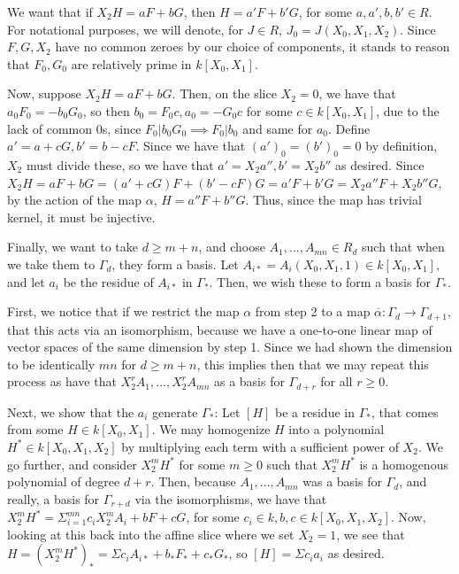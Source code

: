 \documentclass[10pt]{article}
\begin{document}
We want that if $X_2 H = aF + bG$, then $H = a'F + b'G$, for some $a,a',b,b' \in R$. For notational purposes, we will denote, for $J \in R$, $J_0 = J(X_0, X_1, X_2)$. Since $F,G, X_2$ have no common zeroes by our choice of components, it stands to reason that $F_0, G_0$ are relatively prime in $k[X_0,X_1]$.

Now, suppose $X_2 H = aF + bG$. Then, on the slice $X_2 = 0$, we have that $a_0F_0 = - b_0 G_0$, so then $b_0 = F_0c, a_0 = -G_0c$ for some $c \in k[X_0,X_1]$, due to the lack of common 0s, since $F_0 | b_0 G_0 \implies F_0 | b_0$ and same for $a_0$. Define $a' = a  +cG, b' = b - cF$. Since we have that $(a')_0 = (b')_0 = 0$ by definition, $X_2$ must divide these, so we have that $a' = X_2 a'', b' = X_2 b''$ as desired. Since $X_2 H = aF + bG = (a'+cG)F + (b'-cF)G = a'F + b'G = X_2 a''F + X_2 b''G$, by the action of the map $\alpha$, $H = a''F + b''G$. Thus, since the map has trivial kernel, it must be injective.

Finally, we want to take $d \geq m + n$, and choose $A_1,...,A_{mn} \in R_d$ such that when we take them to $\Gamma_d$, they form a basis. Let $A_{i*} = A_i(X_0,X_1,1) \in k[X_0,X_1]$, and let $a_i$ be the residue of $A_{i*}$ in $\Gamma_*$. Then, we wish these to form a basis for $\Gamma_*$.

First, we notice that if we restrict the map $\alpha$ from step 2 to a map $\overline{\alpha}: \Gamma_d \to \Gamma_{d+1}$, that this acts via an isomorphism, because we have a one-to-one linear map of vector spaces of the same dimension by step 1. Since we had shown the dimension to be identically $mn$ for $d \geq m +n$, this implies then that we may repeat this process as have that $X_2^r A_1,...,X_2^r A_{mn}$ as a basis for  $\Gamma_{d+r}$ for all $r \geq 0$.

Next, we show that the $a_i$ generate $\Gamma_*$: Let $[H]$ be a residue in $\Gamma_*$, that comes from some $H \in k[X_0,X_1]$. We may homogenize $H$ into a polynomial $H^* \in k[X_0,X_1,X_2]$ by multiplying each term with a sufficient power of $X_2$. We go further, and consider $X_2^m H^*$ for some $m \geq 0$ such that $X_2^m H^*$ is a homogenous polynomial of degree $d + r$. Then, because $A_1,... ,A_{mn}$ was a basis for $\Gamma_d$, and really, a basis for $\Gamma_{r + d}$ via the isomorphisms, we have that $X_2^m H^* = \Sigma_{i=1}^{mn} c_i X_2^m A_i + bF + cG$, for some $c_i \in k, b,c \in k[X_0,X_1,X_2]$. Now, looking at this back into the affine slice where we set $X_2 = 1$, we see that $H = (X_2^m H^*)_* = \Sigma c_i A_{i*} + b_* F_* + c_* G_*$, so $[H] = \Sigma c_i a_i$ as desired. 
\end{document}
